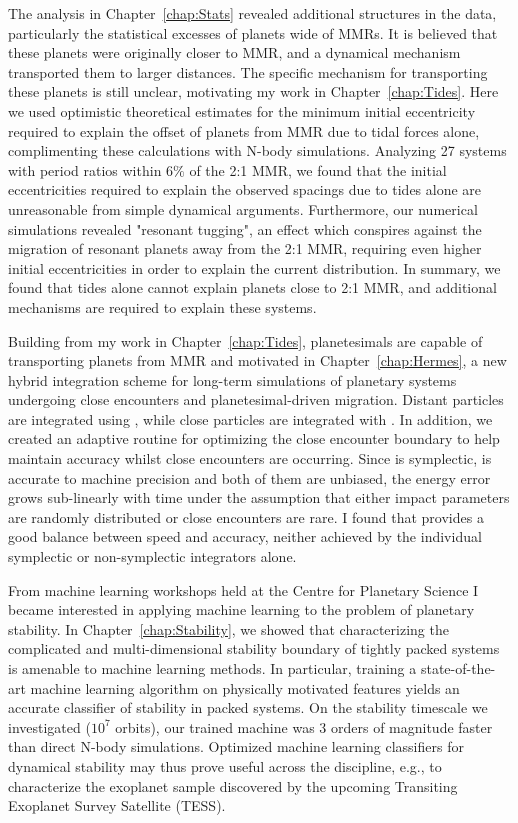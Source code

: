 The analysis in Chapter~\ref{chap:Stats} revealed additional structures in the \kep data, particularly the statistical excesses of planets wide of MMRs.
It is believed that these planets were originally closer to MMR, and a dynamical mechanism transported them to larger distances.
The specific mechanism for transporting these planets is still unclear, motivating my work in Chapter~\ref{chap:Tides}.
Here we used optimistic theoretical estimates for the minimum initial eccentricity required to explain the offset of \kep planets from MMR due to tidal forces alone, complimenting these calculations with N-body simulations.
Analyzing 27 \kep systems with period ratios within $6\%$ of the 2:1 MMR, we found that the initial eccentricities required to explain the observed spacings due to tides alone are unreasonable from simple dynamical arguments.
Furthermore, our numerical simulations revealed "resonant tugging", an effect which conspires against the migration of resonant planets away from the 2:1 MMR, requiring even higher initial eccentricities in order to explain the current \kep distribution. 
In summary, we found that tides alone cannot explain planets close to 2:1 MMR, and additional mechanisms are required to explain these systems. 

Building from my work in Chapter~\ref{chap:Tides}, planetesimals are capable of transporting planets from MMR and motivated \hermes in Chapter~\ref{chap:Hermes}, a new hybrid integration scheme for long-term simulations of planetary systems undergoing close encounters and planetesimal-driven migration. 
Distant particles are integrated using \whfast, while close particles are integrated with \ias.
In addition, we created an adaptive routine for optimizing the close encounter boundary to help maintain accuracy whilst close encounters are occurring.
Since \whfast is symplectic, \ias is accurate to machine precision and both of them are unbiased, the energy error grows sub-linearly with time under the assumption that either impact parameters are randomly distributed or close encounters are rare.
I found that \hermes provides a good balance between speed and accuracy, neither achieved by the individual symplectic or non-symplectic integrators alone.

From machine learning workshops held at the Centre for Planetary Science I became interested in applying machine learning to the problem of planetary stability. 
In Chapter~\ref{chap:Stability}, we showed that characterizing the complicated and multi-dimensional stability boundary of tightly packed systems is amenable to machine learning methods. 
In particular, training a state-of-the-art machine learning algorithm on physically motivated features yields an accurate classifier of stability in packed systems. 
On the stability timescale we investigated ($10^7$ orbits), our trained machine was 3 orders of magnitude faster than direct N-body simulations. 
Optimized machine learning classifiers for dynamical stability may thus prove useful across the discipline, e.g., to characterize the exoplanet sample discovered by the upcoming Transiting Exoplanet Survey Satellite (TESS).

